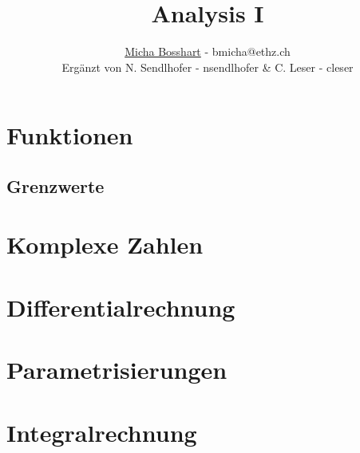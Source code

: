 \documentclass[8pt]{mpscheatsheet}
\author{\href{https://n.ethz.ch/\~bmicha}{Micha Bosshart} - bmicha@ethz.ch\\\footnotesize Ergänzt von N. Sendlhofer - nsendlhofer \& C. Leser - cleser}
\title{Analysis I}
\begin{document}
    \section{Funktionen}
        
        \subsection{Grenzwerte}
        
        
        
        
        
    \section{Komplexe Zahlen}
        
        
        
    \section{Differentialrechnung}
        
        
        
        
        
    \section{Parametrisierungen}
        
        
    \section{Integralrechnung}
        
        
        
        
        
        
        
        
        
\end{document}
